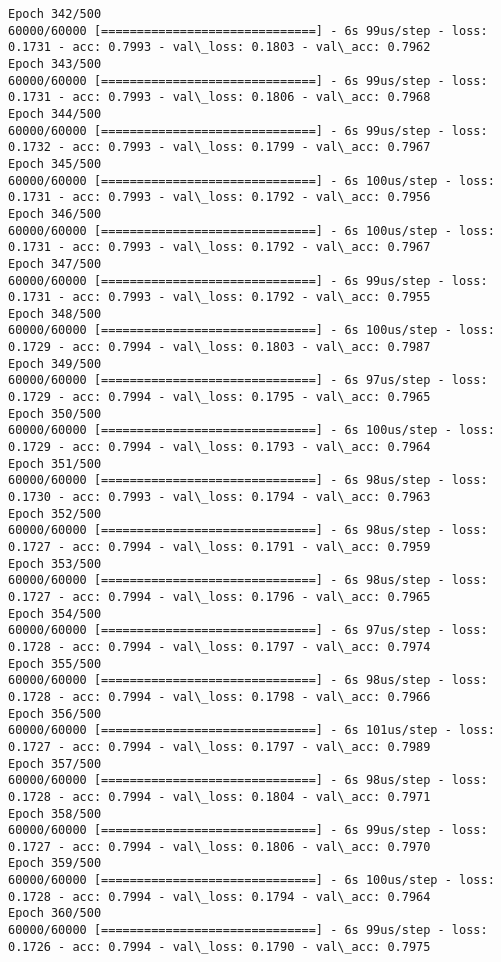 \documentclass[11pt]{article}
\begin{document}
\begin{Verbatim}[commandchars=\\\{\}]
Epoch 342/500
60000/60000 [==============================] - 6s 99us/step - loss: 0.1731 - acc: 0.7993 - val\_loss: 0.1803 - val\_acc: 0.7962
Epoch 343/500
60000/60000 [==============================] - 6s 99us/step - loss: 0.1731 - acc: 0.7993 - val\_loss: 0.1806 - val\_acc: 0.7968
Epoch 344/500
60000/60000 [==============================] - 6s 99us/step - loss: 0.1732 - acc: 0.7993 - val\_loss: 0.1799 - val\_acc: 0.7967
Epoch 345/500
60000/60000 [==============================] - 6s 100us/step - loss: 0.1731 - acc: 0.7993 - val\_loss: 0.1792 - val\_acc: 0.7956
Epoch 346/500
60000/60000 [==============================] - 6s 100us/step - loss: 0.1731 - acc: 0.7993 - val\_loss: 0.1792 - val\_acc: 0.7967
Epoch 347/500
60000/60000 [==============================] - 6s 99us/step - loss: 0.1731 - acc: 0.7993 - val\_loss: 0.1792 - val\_acc: 0.7955
Epoch 348/500
60000/60000 [==============================] - 6s 100us/step - loss: 0.1729 - acc: 0.7994 - val\_loss: 0.1803 - val\_acc: 0.7987
Epoch 349/500
60000/60000 [==============================] - 6s 97us/step - loss: 0.1729 - acc: 0.7994 - val\_loss: 0.1795 - val\_acc: 0.7965
Epoch 350/500
60000/60000 [==============================] - 6s 100us/step - loss: 0.1729 - acc: 0.7994 - val\_loss: 0.1793 - val\_acc: 0.7964
Epoch 351/500
60000/60000 [==============================] - 6s 98us/step - loss: 0.1730 - acc: 0.7993 - val\_loss: 0.1794 - val\_acc: 0.7963
Epoch 352/500
60000/60000 [==============================] - 6s 98us/step - loss: 0.1727 - acc: 0.7994 - val\_loss: 0.1791 - val\_acc: 0.7959
Epoch 353/500
60000/60000 [==============================] - 6s 98us/step - loss: 0.1727 - acc: 0.7994 - val\_loss: 0.1796 - val\_acc: 0.7965
Epoch 354/500
60000/60000 [==============================] - 6s 97us/step - loss: 0.1728 - acc: 0.7994 - val\_loss: 0.1797 - val\_acc: 0.7974
Epoch 355/500
60000/60000 [==============================] - 6s 98us/step - loss: 0.1728 - acc: 0.7994 - val\_loss: 0.1798 - val\_acc: 0.7966
Epoch 356/500
60000/60000 [==============================] - 6s 101us/step - loss: 0.1727 - acc: 0.7994 - val\_loss: 0.1797 - val\_acc: 0.7989
Epoch 357/500
60000/60000 [==============================] - 6s 98us/step - loss: 0.1728 - acc: 0.7994 - val\_loss: 0.1804 - val\_acc: 0.7971
Epoch 358/500
60000/60000 [==============================] - 6s 99us/step - loss: 0.1727 - acc: 0.7994 - val\_loss: 0.1806 - val\_acc: 0.7970
Epoch 359/500
60000/60000 [==============================] - 6s 100us/step - loss: 0.1728 - acc: 0.7994 - val\_loss: 0.1794 - val\_acc: 0.7964
Epoch 360/500
60000/60000 [==============================] - 6s 99us/step - loss: 0.1726 - acc: 0.7994 - val\_loss: 0.1790 - val\_acc: 0.7975

\end{Verbatim}
\end{document}
